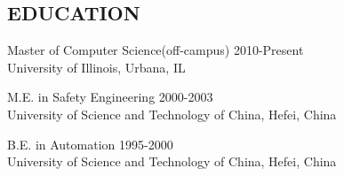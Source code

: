 \documentclass{res}
\begin{document}
\begin{resume}
  \section{EDUCATION} {\sl}
  \vspace{0.1in}
  Master of Computer Science(off-campus) \hfill 2010-Present\\
  University of Illinois, Urbana, IL

  M.E. in Safety Engineering \hfill 2000-2003\\
  University of Science and Technology of China, Hefei, China

  B.E. in Automation \hfill 1995-2000\\
  University of Science and Technology of China, Hefei, China
  
\end{resume}
\end{document}
